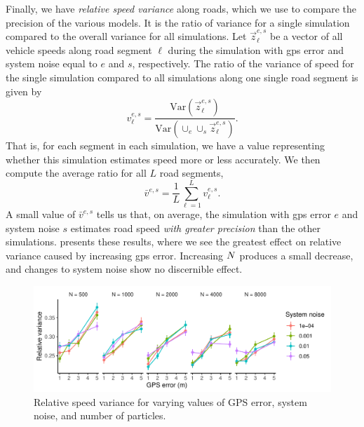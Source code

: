 Finally, we have \emph{relative speed variance} along roads, which we use to compare the precision of the various models. It is the ratio of variance for a single simulation compared to the overall variance for all simulations. Let $\vec z_\ell^{e,s}$ be a vector of all vehicle speeds along road segment $\ell$ during the simulation with \gls{gps} error and system noise equal to $e$ and $s$, respectively. The ratio of the variance of speed for the single simulation compared to all simulations along one single road segment is given by
\begin{equation}
\label{eq:rel_speed_var_ratio}
v_\ell^{e,s} =
\frac{
    \mathrm{Var}(\vec z_\ell^{e,s})
}{
    \mathrm{Var}(\cup_e\cup_s \vec z_\ell^{e,s})
}.
\end{equation}
That is, for each segment in each simulation, we have a value representing whether this simulation estimates speed more or less accurately. We then compute the average ratio for all $L$ road segments,
\begin{equation}
\label{eq:rel_speed_var}
\bar v^{e,s} = \frac{1}{L} \sum_{\ell=1}^L v_\ell^{e,s}.
\end{equation}
A small value of $\bar v^{e,s}$ tells us that, on average, the simulation with \gls{gps} error $e$ and system noise $s$ estimates road speed \emph{with greater precision} than the other simulations.  presents these results, where we see the greatest effect on relative variance caused by increasing \gls{gps} error. Increasing $N$ produces a small decrease, and changes to system noise show no discernible effect.


\begin{knitrout}\small
{}\color{fgcolor}\begin{figure}

{\centering \includegraphics[width=\textwidth]{figure/model_performance_var-1} 

}

\caption[Relative speed variance for varying values of GPS error, system noise, and number of particles]{Relative speed variance for varying values of GPS error, system noise, and number of particles.}\label{fig:model_performance_var}
\end{figure}


\end{knitrout}


